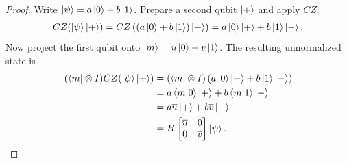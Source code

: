 \begin{proof}
Write $\ket\psi = a\ket0+b\ket1$. Prepare a second qubit $\ket+$ and apply $CZ$:
\begin{align}
    CZ(\ket\psi\ket+)
    =
    CZ\left((a\ket0+b\ket1)\ket+\right)
    =
    a\ket0\ket+ + b\ket1\ket-.
\end{align}
Now project the first qubit onto $\ket m = u\ket0+v\ket1$. The resulting unnormalized state is
\begin{align}
    (\bra m\otimes I)CZ(\ket\psi\ket+)
    &=
    (\bra m\otimes I)
    \left(
        a\ket0\ket+ + b\ket1\ket-
    \right) \\
    &=
    a\braket{m}{0}\ket+
    +
    b\braket{m}{1}\ket- \\
    &=
    a\overline u\ket+
    +
    b\overline v\ket- \\
    &=
    H
    \begin{bmatrix}
        \overline u & 0 \\
        0 & \overline v
    \end{bmatrix}
    \ket\psi.
\end{align}


\end{proof}
